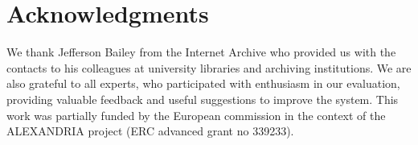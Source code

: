 \documentclass{llncs}
\begin{document}
\section*{Acknowledgments}\label{sec:Acknowledgments}

We thank Jefferson Bailey from the Internet Archive who provided us
with the contacts to his colleagues at university libraries and
archiving institutions. We are also grateful to all experts, who
participated with enthusiasm in our evaluation, providing valuable
feedback and useful suggestions to improve the system. This
work was partially funded by the European commission in the context of
the ALEXANDRIA project (ERC advanced grant no 339233).




\end{document}
